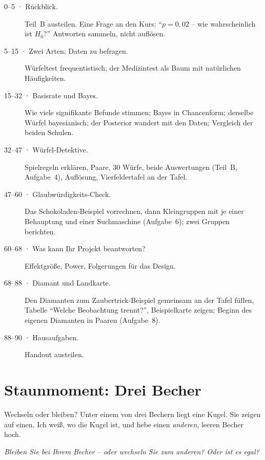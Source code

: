 \begin{ablauf}
\begin{description}
\item[0--5 · Rückblick.] Teil~B austeilen. Eine Frage an den Kurs:
  \enquote{$p=0{,}02$ -- wie wahrscheinlich ist $H_0$?} Antworten
  sammeln, nicht auflösen.
\item[5--15 · Zwei Arten, Daten zu befragen.] Würfeltest frequentistisch;
  der Medizintest als Baum mit natürlichen Häufigkeiten.
\item[15--32 · Basisrate und Bayes.] Wie viele signifikante Befunde
  stimmen; Bayes in Chancenform; derselbe Würfel bayesianisch; der
  Posterior wandert mit den Daten; Vergleich der beiden Schulen.
\item[32--47 · Würfel-Detektive.] Spielregeln erklären, Paare, 30 Würfe,
  beide Auswertungen (Teil~B, Aufgabe~4), Auflösung, Vierfeldertafel an
  der Tafel.
\item[47--60 · Glaubwürdigkeits-Check.] Das Schokoladen-Beispiel
  vorrechnen, dann Kleingruppen mit je einer Behauptung und einer
  Suchmaschine (Aufgabe~6); zwei Gruppen berichten.
\item[60--68 · Was kann Ihr Projekt beantworten?] Effektgröße, Power,
  Folgerungen für das Design.
\item[68--88 · Diamant und Landkarte.] Den Diamanten zum
  Zaubertrick-Beispiel gemeinsam an der Tafel füllen, Tabelle
  \enquote{Welche Beobachtung trennt?}, Beispielkarte zeigen; Beginn des
  eigenen Diamanten in Paaren (Aufgabe~8).
\item[88--90 · Hausaufgaben.] Handout austeilen.
\end{description}
\end{ablauf}

\section{Staunmoment: Drei Becher}
\begin{staunbox}{Wechseln oder bleiben?}
Unter einem von drei Bechern liegt eine Kugel. Sie zeigen auf einen.
Ich weiß, wo die Kugel ist, und hebe einen \emph{anderen}, leeren Becher
hoch.

\emph{Bleiben Sie bei Ihrem Becher -- oder wechseln Sie zum anderen?
Oder ist es egal?}
\end{staunbox}
\os{\newpage}

